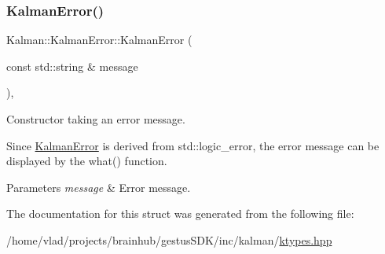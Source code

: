 \subsubsection{\texorpdfstring{Kalman\+Error()}{KalmanError()}}
{\footnotesize\ttfamily Kalman\+::\+Kalman\+Error\+::\+Kalman\+Error (\begin{DoxyParamCaption}\item[{const std\+::string \&}]{message }\end{DoxyParamCaption})\hspace{0.3cm}{\ttfamily [inline]}, {\ttfamily [explicit]}}



Constructor taking an error message. 

Since {\ttfamily \mbox{\hyperlink{structKalman_1_1KalmanError}{Kalman\+Error}}} is derived from {\ttfamily std\+::logic\+\_\+error}, the error message can be displayed by the {\ttfamily what()} function. 
\begin{DoxyParams}{Parameters}
{\em message} & Error message. \\
\hline
\end{DoxyParams}


The documentation for this struct was generated from the following file\+:\begin{DoxyCompactItemize}
\item 
/home/vlad/projects/brainhub/gestus\+S\+D\+K/inc/kalman/\mbox{\hyperlink{ktypes_8hpp}{ktypes.\+hpp}}\end{DoxyCompactItemize}
